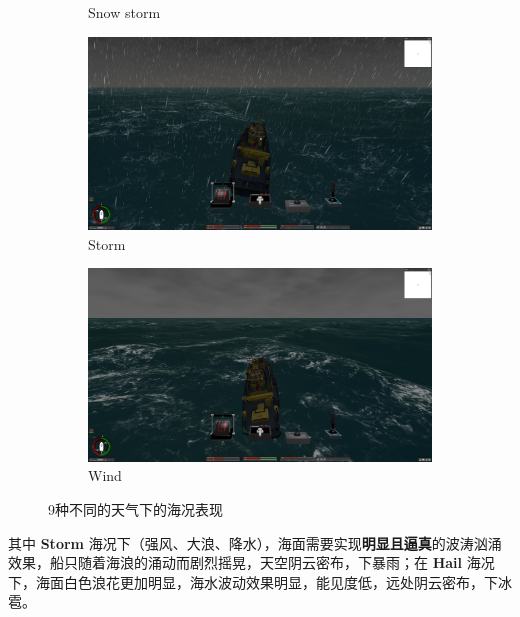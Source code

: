\documentclass[a4paper,10pt]{article}
\begin{document}
\begin{figure}[htbp]
\begin{subfigure}{0.3\textwidth}
				\captionsetup{font=scriptsize}
				\caption{Snow storm}
				\label{fig: Snow storm}	
			\end{subfigure}
			\begin{subfigure}{0.3\textwidth}
				\includegraphics[width=\linewidth]{picture/Storm}
				\captionsetup{font=scriptsize}
				\caption{Storm}
				\label{fig: Storm}	
			\end{subfigure}
			\begin{subfigure}{0.3\textwidth}
				\includegraphics[width=\linewidth]{picture/Wind}
				\captionsetup{font=scriptsize}
				\caption{Wind}
				\label{fig: Wind}
			\end{subfigure}
			\captionsetup{font=scriptsize}
			\caption{
				\label{fig: Weather}
				9种不同的天气下的海况表现
			}
		\end{figure}
		
		其中 \textbf{Storm} 海况下（强风、大浪、降水），海面需要实现\textbf{明显且逼真}的波涛汹涌效果，船只随着海浪的涌动而剧烈摇晃，天空阴云密布，下暴雨；在 \textbf{Hail} 海况下，海面白色浪花更加明显，海水波动效果明显，能见度低，远处阴云密布，下冰雹。
		
\end{document}
